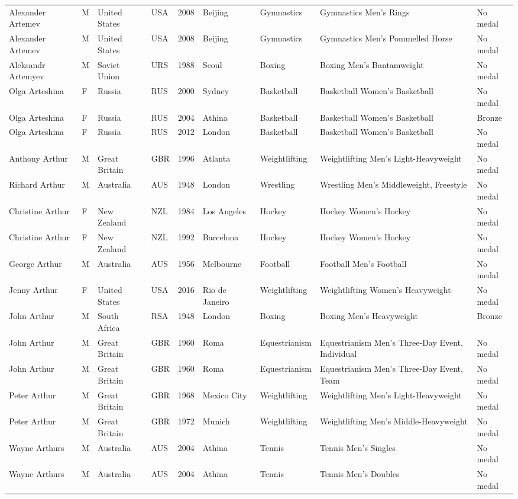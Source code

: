 \documentclass{article}%
\begin{document}
\begin{longtable}{l l l l l l l l l}
Alexander Artemev&M&United States&USA&2008&Beijing&Gymnastics&Gymnastics Men's Rings&No medal\\%
Alexander Artemev&M&United States&USA&2008&Beijing&Gymnastics&Gymnastics Men's Pommelled Horse&No medal\\%
Aleksandr Artemyev&M&Soviet Union&URS&1988&Seoul&Boxing&Boxing Men's Bantamweight&No medal\\%
Olga Arteshina&F&Russia&RUS&2000&Sydney&Basketball&Basketball Women's Basketball&No medal\\%
Olga Arteshina&F&Russia&RUS&2004&Athina&Basketball&Basketball Women's Basketball&Bronze\\%
Olga Arteshina&F&Russia&RUS&2012&London&Basketball&Basketball Women's Basketball&No medal\\%
Anthony Arthur&M&Great Britain&GBR&1996&Atlanta&Weightlifting&Weightlifting Men's Light{-}Heavyweight&No medal\\%
Richard Arthur&M&Australia&AUS&1948&London&Wrestling&Wrestling Men's Middleweight, Freestyle&No medal\\%
Christine Arthur&F&New Zealand&NZL&1984&Los Angeles&Hockey&Hockey Women's Hockey&No medal\\%
Christine Arthur&F&New Zealand&NZL&1992&Barcelona&Hockey&Hockey Women's Hockey&No medal\\%
George Arthur&M&Australia&AUS&1956&Melbourne&Football&Football Men's Football&No medal\\%
Jenny Arthur&F&United States&USA&2016&Rio de Janeiro&Weightlifting&Weightlifting Women's Heavyweight&No medal\\%
John Arthur&M&South Africa&RSA&1948&London&Boxing&Boxing Men's Heavyweight&Bronze\\%
John Arthur&M&Great Britain&GBR&1960&Roma&Equestrianism&Equestrianism Men's Three{-}Day Event, Individual&No medal\\%
John Arthur&M&Great Britain&GBR&1960&Roma&Equestrianism&Equestrianism Men's Three{-}Day Event, Team&No medal\\%
Peter Arthur&M&Great Britain&GBR&1968&Mexico City&Weightlifting&Weightlifting Men's Light{-}Heavyweight&No medal\\%
Peter Arthur&M&Great Britain&GBR&1972&Munich&Weightlifting&Weightlifting Men's Middle{-}Heavyweight&No medal\\%
Wayne Arthurs&M&Australia&AUS&2004&Athina&Tennis&Tennis Men's Singles&No medal\\%
Wayne Arthurs&M&Australia&AUS&2004&Athina&Tennis&Tennis Men's Doubles&No medal\\%

\end{longtable}
\end{document}

